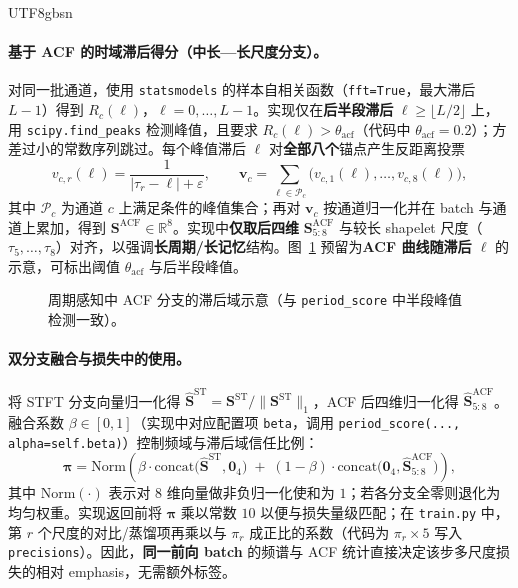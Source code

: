 \documentclass{article}
\begin{document}
\begin{CJK*}{UTF8}{gbsn}
\paragraph{基于 ACF 的时域滞后得分（中长—长尺度分支）。}
对同一批通道，使用 \texttt{statsmodels} 的样本自相关函数（\texttt{fft=True}，最大滞后 $L{-}1$）得到 $R_c(\ell)$，$\ell=0,\ldots,L{-}1$。实现仅在\textbf{后半段滞后} $\ell\ge \lfloor L/2\rfloor$ 上，用 \texttt{scipy.find\_peaks} 检测峰值，且要求 $R_c(\ell)>\theta_{\mathrm{acf}}$（代码中 $\theta_{\mathrm{acf}}=0.2$）；方差过小的常数序列跳过。每个峰值滞后 $\ell$ 对\textbf{全部八个}锚点产生反距离投票
\begin{equation}
v_{c,r}(\ell)=\frac{1}{|\tau_r-\ell|+\varepsilon},\qquad
\mathbf{v}_c=\sum_{\ell\in\mathcal{P}_c}\bigl(v_{c,1}(\ell),\ldots,v_{c,8}(\ell)\bigr),
\end{equation}
其中 $\mathcal{P}_c$ 为通道 $c$ 上满足条件的峰值集合；再对 $\mathbf{v}_c$ 按通道归一化并在 batch 与通道上累加，得到 $\mathbf{S}^{\mathrm{ACF}}\in\mathbb{R}^8$。实现中\textbf{仅取后四维} $\mathbf{S}^{\mathrm{ACF}}_{5:8}$ 与较长 shapelet 尺度（$\tau_5,\ldots,\tau_8$）对齐，以强调\textbf{长周期/长记忆}结构。图~\ref{fig:period-acf} 预留为\textbf{ACF 曲线随滞后 $\ell$} 的示意，可标出阈值 $\theta_{\mathrm{acf}}$ 与后半段峰值。

\begin{figure}[t]
  \centering
  \caption{周期感知中 ACF 分支的滞后域示意（与 \texttt{period\_score} 中半段峰值检测一致）。}
  \label{fig:period-acf}
\end{figure}

\paragraph{双分支融合与损失中的使用。}
将 STFT 分支向量归一化得 $\hat{\mathbf{S}}^{\mathrm{ST}}=\mathbf{S}^{\mathrm{ST}}/\|\mathbf{S}^{\mathrm{ST}}\|_1$，ACF 后四维归一化得 $\hat{\mathbf{S}}^{\mathrm{ACF}}_{5:8}$。融合系数 $\beta\in[0,1]$（实现中对应配置项 \texttt{beta}，调用 \texttt{period\_score(..., alpha=self.beta)}）控制频域与滞后域信任比例：
\begin{equation}
\bm{\pi}=\mathrm{Norm}\!\left(
\beta\cdot \mathrm{concat}\!\bigl(\hat{\mathbf{S}}^{\mathrm{ST}},\mathbf{0}_{4}\bigr)
\;+\;
(1-\beta)\cdot \mathrm{concat}\!\bigl(\mathbf{0}_{4},\hat{\mathbf{S}}^{\mathrm{ACF}}_{5:8}\bigr)
\right),
\label{eq:period-fuse}
\end{equation}
其中 $\mathrm{Norm}(\cdot)$ 表示对 8 维向量做非负归一化使和为 $1$；若各分支全零则退化为均匀权重。实现返回前将 $\bm{\pi}$ 乘以常数 $10$ 以便与损失量级匹配；在 \texttt{train.py} 中，第 $r$ 个尺度的对比/蒸馏项再乘以与 $\pi_r$ 成正比的系数（代码为 $\pi_r\times 5$ 写入 \texttt{precisions}）。因此，\textbf{同一前向 batch} 的频谱与 ACF 统计直接决定该步多尺度损失的相对 emphasis，无需额外标签。


\end{CJK*}
\end{document}
